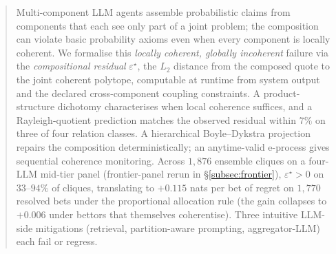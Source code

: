 \documentclass{article}
\theoremstyle{plain}
\theoremstyle{definition}
\theoremstyle{remark}
\newcommand{\eps}{\varepsilon}
\begin{document}

\printAffiliationsAndNotice{}  %

\begin{abstract}
Multi-component LLM agents assemble probabilistic claims from
components that each see only part of a joint problem; the
composition can violate basic probability axioms even when every
component is locally coherent. We formalise this \emph{locally
coherent, globally incoherent} failure via the \emph{compositional
residual} $\eps^\star$, the $L_2$ distance from the composed
quote to the joint coherent polytope, computable at runtime from
system output and the declared cross-component coupling
constraints. A product-structure dichotomy characterises when
local coherence suffices, and a Rayleigh-quotient prediction
matches the observed residual within $7\%$ on three of four
relation classes. A hierarchical Boyle--Dykstra projection
repairs the composition deterministically; an anytime-valid
e-process gives sequential coherence monitoring. Across $1{,}876$
ensemble cliques on a four-LLM mid-tier panel (frontier-panel
rerun in \S\ref{subsec:frontier}), $\eps^\star\!>\!0$ on
$33$--$94\%$ of cliques, translating to $+0.115$ nats per bet of
regret on $1{,}770$ resolved bets under the proportional
allocation rule (the gain collapses to $+0.006$ under bettors
that themselves coherentise). Three intuitive LLM-side
mitigations (retrieval, partition-aware prompting,
aggregator-LLM) each fail or regress.
\end{abstract}
\end{document}
